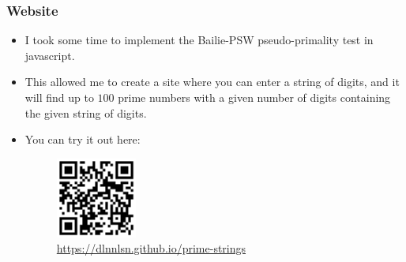 \documentclass{beamer}
\begin{document}
\begin{frame}
    \frametitle{Website}

    \begin{itemize}
        \item I took some time to implement the Bailie-PSW pseudo-primality test in javascript. \pause
        \item This allowed me to create a site where you can enter a string of digits, and it will find up to $100$ prime numbers with a given number of digits containing the given string of digits. \pause
        \item You can try it out here:
        \begin{figure}
            \centering
            \includegraphics[width=0.25\textwidth]{prime_strings.png}
            \caption{\url{https://dlnnlsn.github.io/prime-strings}}
        \end{figure}
    \end{itemize} 

\end{frame}
\end{document}
